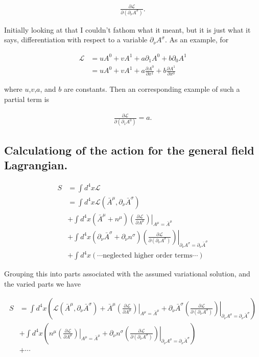 \documentclass{article}
\newcommand{\LL}[0]{\mathcal{L}}
\newcommand{\PD}[2]{\frac{\partial {#2}}{\partial {#1}}}
\newcommand{\barA}[0]{\bar{A}}
\begin{document}
\begin{align*}
\PD{(\partial_\nu A^\sigma)}{\LL}.
\end{align*}

Initially looking at that I couldn't fathom what it meant, but it is just what it says, 
differentiation with respect to a variable $\partial_\nu A^\sigma$.  As an example, for

\begin{align*}
\LL 
&= u A^0 + v A^1 + a \partial_1 A^0 + b \partial_0 A^1 \\
&= u A^0 + v A^1 + a \PD{x^1}{A^0} + b \PD{x^0}{A^1}
\end{align*}

where $u$,$v$,$a$, and $b$ are constants.  Then an corresponding example of such a partial term is

\begin{align*}
\PD{(\partial_1 A^0)}{\LL} = a.
\end{align*}

\subsection{ Calculationg of the action for the general field Lagrangian. }

\begin{align*}
S &= \int d^4 x \LL \\
&= \int d^4 x \LL(\barA^\mu, \partial_\nu \barA^\sigma ) \\
&+ \int d^4 x (\barA^\mu + n^\mu) \left( \left. \PD{A^\mu}{\LL} \right) \right\vert_{A^\mu = \barA^\mu} \\
&+ \int d^4 x (\partial_\nu \barA^\sigma + \partial_\nu n^\sigma) \left( \left. \PD{(\partial_\nu A^\sigma)}{\LL} \right) \right\vert_{\partial_\nu A^\sigma = \partial_\nu \barA^\sigma} \\
&+ \int d^4 x (\cdots \text{neglected higher order terms} \cdots )
\end{align*}

Grouping this into parts associated with the assumed variational solution, and the varied parts we have

\begin{align*}
S &= \int d^4 x 
\left(
\LL(\barA^\mu, \partial_\nu \barA^\sigma ) + \barA^\mu \left. \left( \PD{A^\mu}{\LL} \right) \right\vert_{A^\mu = \barA^\mu} 
+ \partial_\nu \barA^\sigma \left. \left( \PD{(\partial_\nu A^\sigma)}{\LL} \right) \right\vert_{\partial_\nu A^\sigma = \partial_\nu \barA^\sigma} 
\right) \\
&+ \int d^4 x 
\left(
n^\mu \left. \left( \PD{A^\mu}{\LL} \right) \right\vert_{A^\mu = \barA^\mu} 
+\partial_\nu n^\sigma \left. \left( \PD{(\partial_\nu A^\sigma)}{\LL} \right) \right\vert_{\partial_\nu A^\sigma = \partial_\nu \barA^\sigma}
\right) \\
&+ \cdots
\end{align*}
\end{document}
